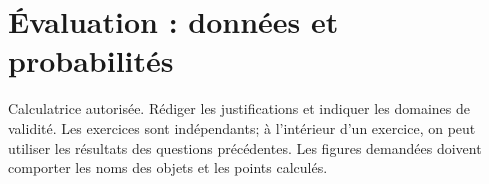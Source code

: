 \begingroup
\chapter*{Évaluation : données et probabilités}
\renewcommand{\thebmtexo}{DS4.\arabic{bmtexo}}
\renewcommand{\theHbmtexo}{DS4.\arabic{bmtexo}}
\setcounter{bmtexo}{0}
\begin{devoir}
Calculatrice autorisée. Rédiger les justifications et indiquer les domaines de validité. Les exercices sont indépendants; à l’intérieur d’un exercice, on peut utiliser les résultats des questions précédentes. Les figures demandées doivent comporter les noms des objets et les points calculés.
\end{devoir}

